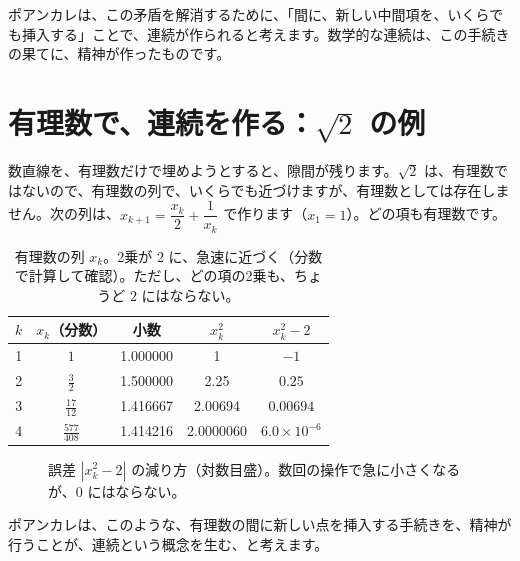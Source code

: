 \documentclass[a4paper,11pt,openany]{ltjsbook}
\begin{document}
ポアンカレは、この矛盾を解消するために、「間に、新しい中間項を、いくらでも挿入する」ことで、連続が作られると考えます。数学的な連続は、この手続きの果てに、精神が作ったものです。

\section{有理数で、連続を作る：$\sqrt2$ の例}

数直線を、有理数だけで埋めようとすると、隙間が残ります。$\sqrt2$ は、有理数ではないので、有理数の列で、いくらでも近づけますが、有理数としては存在しません。次の列は、$x_{k+1}=\dfrac{x_k}2+\dfrac1{x_k}$ で作ります（$x_1=1$）。どの項も有理数です。

\begin{table}[htbp]
\centering
\begin{tabular}{c|cccc}
\toprule
$k$ & $x_k$（分数） & 小数 & $x_k^2$ & $x_k^2-2$\\
\midrule
1 & $1$ & 1.000000 & 1 & $-1$\\
2 & $\tfrac32$ & 1.500000 & 2.25 & $0.25$\\
3 & $\tfrac{17}{12}$ & 1.416667 & 2.00694 & $0.00694$\\
4 & $\tfrac{577}{408}$ & 1.414216 & 2.0000060 & $6.0\times10^{-6}$\\
\bottomrule
\end{tabular}
\caption{有理数の列 $x_k$。2乗が $2$ に、急速に近づく（分数で計算して確認）。ただし、どの項の2乗も、ちょうど $2$ にはならない。}
\end{table}

\begin{figure}[htbp]
\centering
{}
\caption{誤差 $|x_k^2-2|$ の減り方（対数目盛）。数回の操作で急に小さくなるが、$0$ にはならない。}
\end{figure}

ポアンカレは、このような、有理数の間に新しい点を挿入する手続きを、精神が行うことが、連続という概念を生む、と考えます。
\end{document}
